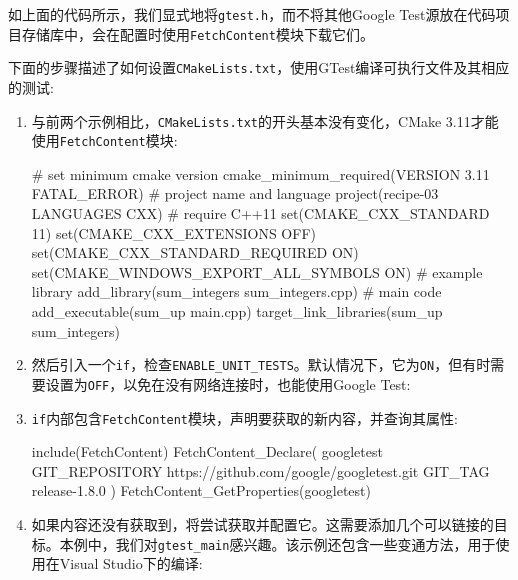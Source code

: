 如上面的代码所示，我们显式地将\texttt{gtest.h}，而不将其他Google Test源放在代码项目存储库中，会在配置时使用\texttt{FetchContent}模块下载它们。


下面的步骤描述了如何设置\texttt{CMakeLists.txt}，使用GTest编译可执行文件及其相应的测试:

\begin{enumerate}
\item 与前两个示例相比，\texttt{CMakeLists.txt}的开头基本没有变化，CMake 3.11才能使用\texttt{FetchContent}模块:

\begin{codebox}[cmake]
# set minimum cmake version
cmake_minimum_required(VERSION 3.11 FATAL_ERROR)
# project name and language
project(recipe-03 LANGUAGES CXX)
# require C++11
set(CMAKE_CXX_STANDARD 11)
set(CMAKE_CXX_EXTENSIONS OFF)
set(CMAKE_CXX_STANDARD_REQUIRED ON)
set(CMAKE_WINDOWS_EXPORT_ALL_SYMBOLS ON)
# example library
add_library(sum_integers sum_integers.cpp)
# main code
add_executable(sum_up main.cpp)
target_link_libraries(sum_up sum_integers)
\end{codebox}

\item 然后引入一个\texttt{if}，检查\texttt{ENABLE\_UNIT\_TESTS}。默认情况下，它为\texttt{ON}，但有时需要设置为\texttt{OFF}，以免在没有网络连接时，也能使用Google Test:


\item \texttt{if}内部包含\texttt{FetchContent}模块，声明要获取的新内容，并查询其属性:

\begin{codebox}[cmake]
include(FetchContent)
FetchContent_Declare(
  googletest
  GIT_REPOSITORY https://github.com/google/googletest.git
  GIT_TAG release-1.8.0
)
FetchContent_GetProperties(googletest)
\end{codebox}

\item 如果内容还没有获取到，将尝试获取并配置它。这需要添加几个可以链接的目标。本例中，我们对\texttt{gtest\_main}感兴趣。该示例还包含一些变通方法，用于使用在Visual Studio下的编译:


\end{enumerate}
